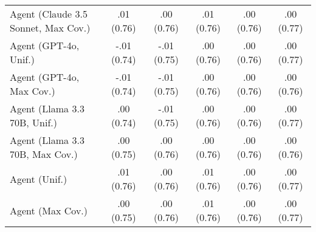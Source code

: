 \begin{table}[h!]
\begin{tabular}{lccccc}
    Agent (Claude 3.5 Sonnet, Max Cov.) & \cellcolor{bronze!30}.01 {\small (0.76)} & \cellcolor{silver!30}.00 {\small (0.76)} & \cellcolor{bronze!30}.01 {\small (0.76)} & .00 {\small (0.76)} & .00 {\small (0.77)} \\
    Agent (GPT-4o, Unif.) & -.01 {\small (0.74)} & -.01 {\small (0.75)} & .00 {\small (0.76)} & .00 {\small (0.76)} & .00 {\small (0.77)} \\
    Agent (GPT-4o, Max Cov.) & -.01 {\small (0.74)} & -.01 {\small (0.75)} & .00 {\small (0.76)} & .00 {\small (0.76)} & .00 {\small (0.76)} \\
    Agent (Llama 3.3 70B, Unif.) & .00 {\small (0.74)} & -.01 {\small (0.75)} & .00 {\small (0.76)} & .00 {\small (0.76)} & .00 {\small (0.77)} \\
    Agent (Llama 3.3 70B, Max Cov.) & .00 {\small (0.75)} & .00 {\small (0.76)} & .00 {\small (0.76)} & .00 {\small (0.76)} & .00 {\small (0.76)} \\
    Agent (Unif.) & .01 {\small (0.76)} & \cellcolor{bronze!30}.00 {\small (0.76)} & \cellcolor{bronze!30}.01 {\small (0.76)} & .00 {\small (0.76)} & \cellcolor{bronze!30}.00 {\small (0.77)} \\
    Agent (Max Cov.) & .00 {\small (0.75)} & .00 {\small (0.76)} & .01 {\small (0.76)} & .00 {\small (0.76)} & \cellcolor{bronze!30}.00 {\small (0.77)} \\
    \bottomrule
    \end{tabular}
\end{table}